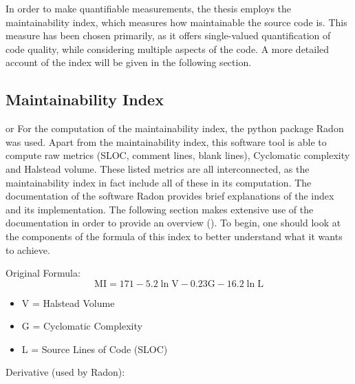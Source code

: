 In order to make quantifiable measurements, the thesis employs the maintainability index, which measures how maintainable the source code is.  This measure has been chosen primarily, as it offers single-valued quantification of code quality, while considering multiple aspects of the code. A more detailed account of the index will be given in the following section.

\subsection{Maintainability Index}
or
For the computation of the maintainability index, the python package Radon was used. Apart from the maintainability index, this software tool is able to compute raw metrics (SLOC, comment lines, blank lines), Cyclomatic complexity and Halstead volume. These listed metrics are all interconnected, as the maintainability index in fact include all of these in its computation. The documentation of the software Radon provides brief explanations of the index and its implementation. The following section makes extensive use of the documentation in order to provide an overview (\cite{radon}). To begin, one should look at the components of the formula of this index to better understand what it wants to achieve.  


Original Formula:
\begin{equation}
\mathrm{MI}=171-5.2 \ln \mathrm{V}-0.23 \mathrm{G}-16.2 \ln \mathrm{L}
\end{equation}

\begin{itemize}
\item V = Halstead Volume
\item G = Cyclomatic Complexity
\item L = Source Lines of Code (SLOC)
\end{itemize}

Derivative (used by Radon):


